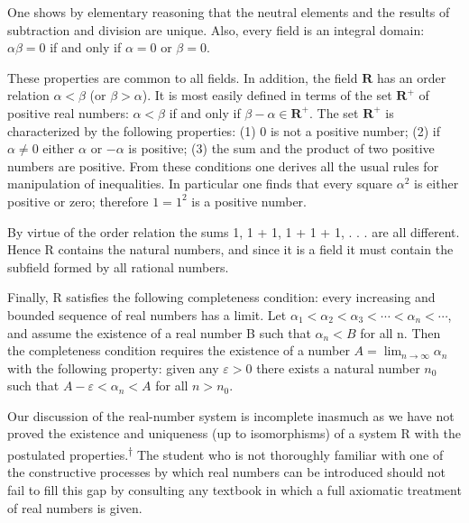 One shows by elementary reasoning that the neutral elements and the results of subtraction and division are unique. Also, every field is an integral domain: $\alpha\beta = 0$ if and only if $\alpha = 0$ or $\beta = 0$.

\begingroup\renewcommand{\thefootnote}{}\endgroup

These properties are common to all fields. In addition, the field $\mathbf{R}$ has an order relation $\alpha < \beta$ (or $\beta > \alpha$). It is most easily defined in terms of the set $\mathbf{R}^{+}$ of positive real numbers: $\alpha < \beta$ if and only if $\beta - \alpha \in \mathbf{R}^{+}$. The set $\mathbf{R}^{+}$ is characterized by the following properties: (1) 0 is not a positive number; (2) if $\alpha \neq 0$ either $\alpha$ or $-\alpha$ is positive; (3) the sum and the product of two positive numbers are positive. From these conditions one derives all the usual rules for manipulation of inequalities. In particular one finds that every square $\alpha^{2}$ is either positive or zero; therefore $1 = 1^{2}$ is a positive number.

By virtue of the order relation the sums 1, 1 + 1, 1 + 1 + 1, . . . are all different. Hence R contains the natural numbers, and since it is a field it must contain the subfield formed by all rational numbers.

Finally, R satisfies the following completeness condition: every increasing and bounded sequence of real numbers has a limit. Let $\alpha_{1} < \alpha_{2} < \alpha_{3} < \cdots < \alpha_{n} < \cdots$, and assume the existence of a real number B such that $\alpha_{n} < B$ for all n. Then the completeness condition requires the existence of a number $A = \lim_{n \to \infty} \alpha_{n}$ with the following property: given any $\varepsilon > 0$ there exists a natural number $n_{0}$ such that $A - \varepsilon < \alpha_{n} < A$ for all $n > n_{0}$.

Our discussion of the real-number system is incomplete inasmuch as we have not proved the existence and uniqueness (up to isomorphisms) of a system R with the postulated properties.\hyperlink{fn:21:dagger}{\textsuperscript{\ensuremath{\dagger}}} The student who is not thoroughly familiar with one of the constructive processes by which real numbers can be introduced should not fail to fill this gap by consulting any textbook in which a full axiomatic treatment of real numbers is given.

